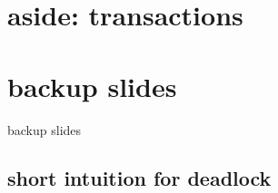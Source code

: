 \documentclass[aspectratio=169]{mytalk}
\begin{document}
\section{aside: transactions}


\begin{frame}
\end{frame}

\begin{frame}
\end{frame}

\begin{frame}
\end{frame}

\section{backup slides}
\begin{frame}{backup slides}
\end{frame}

\subsection{short intuition for deadlock}






\end{document}
